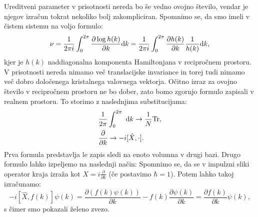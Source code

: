 Ureditveni parameter v prisotnosti nereda bo še vedno ovojno število, vendar je njegov izračun tokrat nekoliko bolj zakompliciran.
Spomnimo se, da smo imeli v čistem sistemu na voljo formulo:
\begin{equation}
\nu = \frac{1}{2 \pi i} \int_0^{2 \pi} \frac{\partial \log h(k)}{\partial k} \textup{d}k = \frac{1}{2 \pi i} \int_0^{2 \pi} \frac{\partial h(k)}{\partial k} \frac{1}{h(k)} \textup{d}k,
\end{equation}
kjer je $h(k)$ naddiagonalna komponenta Hamiltonjana v recipročnem prostoru. V prisotnosti nereda nimamo več translacijske invariance in torej tudi nimamo več dobro določenega kristalnega valovnega vektorja. Očitno izraz za ovojno število v recipročnem prostoru ne bo dober, zato bomo zgornjo formulo zapisali v realnem prostoru.
To storimo z naslednjima substitucijama:
\begin{align}
&\frac{1}{2 \pi} \int_0^{2 \pi}\  \textup{d}k \to \frac{1}{N} \mathrm{Tr}, \\
&\frac{\partial}{\partial k} \to  -i [\hat{X}, \cdot ]. 
\end{align}
Prva formula predstavlja le zapis sledi na enoto volumna v drugi bazi. Drugo formulo lahko izpeljemo na naslednji način: 
Spomnimo se, da se v impulzni sliki operator kraja izraža kot $X = i \frac{\partial}{\partial k}$ (če postavimo $\hbar = 1$). Potem lahko takoj izračunamo:
\begin{equation}
 -i [\hat{X}, f(k)] \psi(k) =  \frac{\partial \left(f(k) \psi(k) \right)}{\partial k} - f(k) \frac{\partial \psi(k)}{\partial k} = \frac{\partial f(k)}{\partial k} \psi(k),
\end{equation}
s čimer smo pokazali želeno zvezo.


